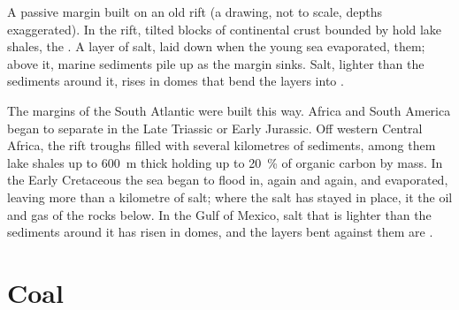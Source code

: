 \begin{omfigure}

{\small A passive margin built on an old rift (a drawing, not to scale, depths
exaggerated). In the rift, tilted blocks of continental crust bounded by
 hold lake shales, the . A layer of salt, laid down
when the young sea evaporated,  them; above it, marine sediments pile
up as the margin sinks. Salt, lighter than the sediments around it, rises
in domes that bend the layers into .}
\end{omfigure}

The margins of the South Atlantic were built this way. Africa and South
America began to separate in the Late Triassic or Early Jurassic. Off
western Central Africa, the rift troughs filled with several kilometres of
sediments, among them lake shales up to \qty{600}{m} thick holding up to
\qty{20}{\percent} of organic carbon by mass. In the Early Cretaceous the sea
began to flood in, again and again, and evaporated, leaving more than a
kilometre of salt; where the salt has stayed in place, it  the oil and
gas of the rocks below. In the Gulf of Mexico, salt that is lighter than the
sediments around it has risen in domes, and the layers bent against them
are .

\section{Coal}

